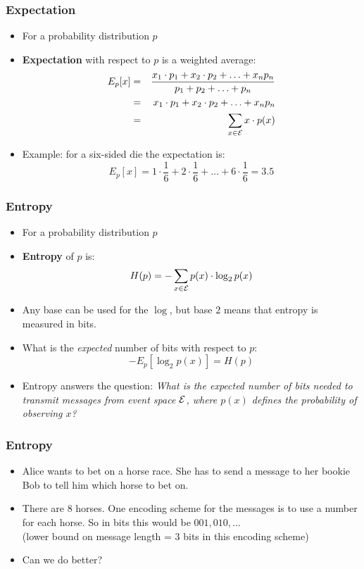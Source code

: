 \documentclass[handout]{beamer}
\begin{document}
\begin{frame}[fragile]
\frametitle{Expectation}
\begin{itemize}[<+->]
\item For a probability distribution $p$
\item \textbf{Expectation} with respect to $p$ is a weighted average:
\begin{eqnarray*}
 E_p[x] &=& \frac{x_1 \cdot p_1 + x_2 \cdot p_2 + \ldots + x_n p_n}{p_1 + p_2 + \ldots + p_n} \\
  &=& x_1 \cdot p_1 + x_2 \cdot p_2 + \ldots + x_n p_n \\
  &=& \sum_{x \in {\cal E}} x \cdot p(x) 
\end{eqnarray*}
\item Example: for a six-sided die the expectation is:
\[ E_p[x] = 1 \cdot \frac{1}{6} + 2 \cdot \frac{1}{6} + \ldots + 6 \cdot \frac{1}{6} = 3.5 \]
\end{itemize}

\end{frame}

\begin{frame}
\frametitle{Entropy}
\begin{itemize}[<+->]
\item For a probability distribution $p$
\item \textbf{Entropy} of $p$ is: 
\[ H(p) = - \sum_{x \in {\cal E}} p(x) \cdot \log_2 p(x) \]
\item Any base can be used for the $\log$, but base $2$ means
  that entropy is measured in bits.
\item What is the {\it expected} number of bits with respect to $p$:
\[ - E_p [ \log_2 p(x) ] = H(p) \]
\item Entropy answers the question: {\it What is the expected
  number of bits needed to transmit messages from event 
  space ${\cal E}$, where $p(x)$ defines the probability of observing $x$?} 
\end{itemize}

\end{frame}

\begin{frame}
\frametitle{Entropy}
\begin{itemize}[<+->]
\item Alice wants to bet on a horse race. She has to send a message to
  her bookie Bob to tell him which horse to bet on.
\item There are 8 horses. One encoding scheme for the messages is to
  use a number for each horse. So in bits this would be $001, 010,
  \ldots$\\
(lower bound on message length = 3 bits in this encoding scheme) 
\item Can we do better?
\end{itemize}

\end{frame}
\end{document}
